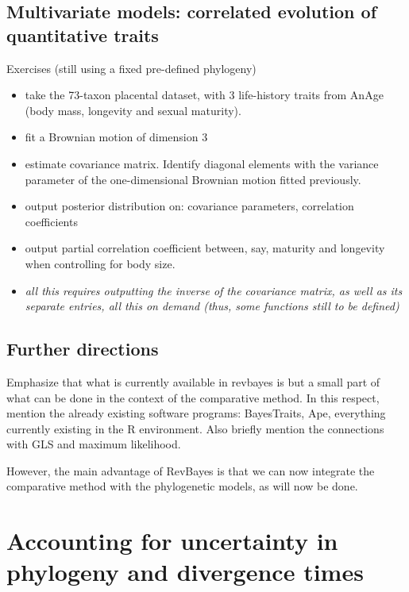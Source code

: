 \documentclass[11pt, oneside]{article}   	%
\begin{document}
\subsection{Multivariate models: correlated evolution of quantitative traits}

Exercises (still using a fixed pre-defined phylogeny)
\begin{itemize}
\item
take the 73-taxon placental dataset, with 3 life-history traits from AnAge (body mass, longevity and sexual maturity).
\item
fit a Brownian motion of dimension 3
\item
estimate covariance matrix. Identify diagonal elements with the variance parameter of the one-dimensional Brownian motion fitted previously.
\item
output posterior distribution on: covariance parameters, correlation coefficients
\item
output partial correlation coefficient between, say, maturity and longevity when controlling for body size.
\item
\emph{all this requires outputting the inverse of the covariance matrix, as well as its separate entries, all this on demand (thus, some functions still to be defined)}
\end{itemize}

\subsection{Further directions}

Emphasize that what is currently available in revbayes is but a small part of what can be done in the context of the comparative method. In this respect, mention the already existing software programs: BayesTraits, Ape, everything currently existing in the R environment. Also briefly mention the connections with GLS and maximum likelihood.

However, the main advantage of RevBayes is that we can now integrate the comparative method with the phylogenetic models, as will now be done.

\section{Accounting for uncertainty in phylogeny and divergence times}
\end{document}
